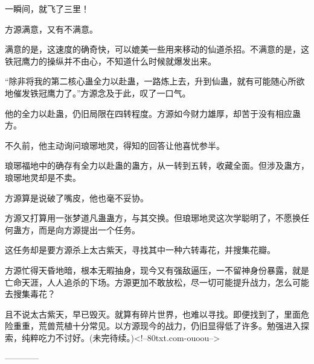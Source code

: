 \begin{this_body}
一瞬间，就飞了三里！

方源满意，又有不满意。

满意的是，这速度的确奇快，可以媲美一些用来移动的仙道杀招。不满意的是，这铁冠鹰力的操纵并不由心，不知道什么时候就爆发出来。

“除非将我的第二核心蛊全力以赴蛊，一路炼上去，升到仙蛊，就有可能随心所欲地催发铁冠鹰力了。”方源念及于此，叹了一口气。

他的全力以赴蛊，仍旧局限在四转程度。方源如今财力雄厚，却苦于没有相应蛊方。

不久前，他主动询问琅琊地灵，得知的回答让他喜忧参半。

琅琊福地中的确存有全力以赴蛊的蛊方，从一转到五转，收藏全面。但涉及蛊方，琅琊地灵却是不卖。

方源算是说破了嘴皮，他也毫不妥协。

方源又打算用一张梦道凡蛊蛊方，与其交换。但琅琊地灵这次学聪明了，不愿换任何蛊方，而是向方源提出一个任务。

这任务却是要方源杀上太古紫天，寻找其中一种六转毒花，并搜集花瓣。

方源忙得天昏地暗，根本无暇抽身，现今又有强敌逼压，一不留神身份暴露，就是亡命天涯，人人追杀的下场。方源更加不敢放松，尽一切可能提升战力，怎么可能去搜集毒花？

且不说太古紫天，早已毁灭。就算有碎片世界，也难以寻找。即便找到了，里面危险重重，荒兽荒植十分常见。以方源现今的战力，仍旧显得低了许多。勉强进入探索，纯粹吃力不讨好。(未完待续。)<!--80txt.com-ouoou-->

------------

\end{this_body}

